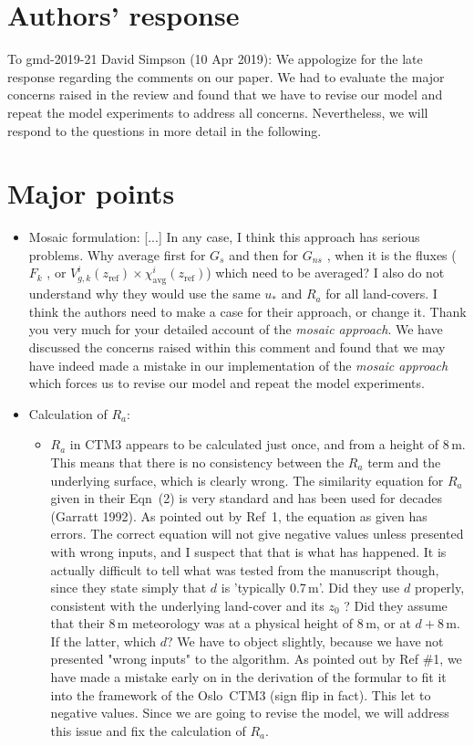 \documentclass{scrartcl}
\begin{document}
\section*{Authors' response}
To gmd-2019-21 David Simpson (10 Apr 2019):
We appologize for the late response regarding the comments on our paper. We had to evaluate the major concerns raised in the review and found that we have to revise our model and repeat the model experiments to address all concerns. Nevertheless, we will respond to the questions in more detail in the following.

\section{Major points}
\begin{itemize}
\item {\color{blue} Mosaic formulation: [...] In any case, I think this approach has serious problems. Why average first for $G_s$ and then for $G_{ns}$ , when it is the fluxes ($F_k$ , or $V^i_{g,k}(z_\mathrm{ref}) \times \chi^i_\mathrm{avg}(z_\mathrm{ref})$) which need to be averaged? I also do not understand why they would use the same $u_*$ and $R_a$ for all land-covers. I think the authors need to make a case for their approach, or change it.}
  Thank you very much for your detailed account of the \emph{mosaic approach}. We have discussed the concerns raised within this comment and found that we may have indeed made a mistake in our implementation of the \emph{mosaic approach} which forces us to revise our model and repeat the model experiments.
\item {\color{blue} Calculation of $R_a$:}
  \begin{itemize}
  \item {\color{blue} $R_a$ in CTM3 appears to be calculated just once, and from a height of 8\,m. This means
that there is no consistency between the $R_a$ term and the underlying surface, which is
clearly wrong. The similarity equation for $R_a$ given in their Eqn~(2) is very standard and has been
used for decades (Garratt 1992). As pointed out by Ref~1, the equation as given has
errors. The correct equation will not give negative values unless presented with wrong
inputs, and I suspect that that is what has happened. It is actually difficult to tell what
was tested from the manuscript though, since they state simply that $d$ is ’typically 0.7\,m’.
Did they use $d$ properly, consistent with the underlying land-cover and its $z_0$ ? Did
they assume that their 8\,m meteorology was at a physical height of 8\,m, or at $d + 8\,\mathrm{m}$.
If the latter, which $d$?}
    We have to object slightly, because we have not presented "wrong inputs" to the algorithm. As pointed out by Ref \#1, we have made a mistake early on in the derivation of the formular to fit it into the framework of the Oslo~CTM3 (sign flip in fact). This let to negative values. 
    Since we are going to revise the model, we will address this issue and fix the calculation of $R_a$. 


\end{itemize}
\end{itemize}
\end{document}
